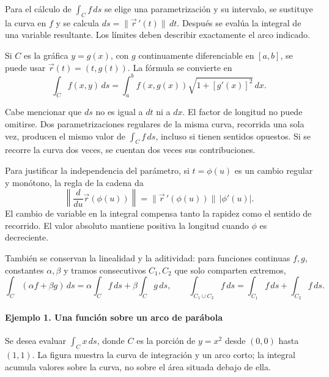 Para el cálculo de $\int_C f\,ds$ se elige una parametrización y su intervalo, se sustituye la curva en $f$ y se calcula $ds=\|\vec r\,'(t)\|\,dt$. Después se evalúa la integral de una variable resultante. Los límites deben describir exactamente el arco indicado.

Si $C$ es la gráfica $y=g(x)$, con $g$ continuamente diferenciable en $[a,b]$, se puede usar $\vec r(t)=(t,g(t))$. La fórmula se convierte en
\[
\int_C f(x,y)\,ds
=\int_a^b f(x,g(x))\sqrt{1+[g'(x)]^2}\,dx.
\]

Cabe mencionar que $ds$ no es igual a $dt$ ni a $dx$. El factor de longitud no puede omitirse. Dos parametrizaciones regulares de la misma curva, recorrida una sola vez, producen el mismo valor de $\int_C f\,ds$, incluso si tienen sentidos opuestos. Si se recorre la curva dos veces, se cuentan dos veces sus contribuciones.

Para justificar la independencia del parámetro, si $t=\phi(u)$ es un cambio regular y monótono, la regla de la cadena da
\[
\left\|\frac{d}{du}\vec r(\phi(u))\right\|
=\|\vec r\,'(\phi(u))\|\,|\phi'(u)|.
\]
El cambio de variable en la integral compensa tanto la rapidez como el sentido de recorrido. El valor absoluto mantiene positiva la longitud cuando $\phi$ es decreciente.

También se conservan la linealidad y la aditividad: para funciones continuas $f,g$, constantes $\alpha,\beta$ y tramos consecutivos $C_1,C_2$ que solo comparten extremos,
\[
\int_C(\alpha f+\beta g)\,ds
=\alpha\int_C f\,ds+\beta\int_C g\,ds,
\qquad
\int_{C_1\cup C_2}f\,ds=\int_{C_1}f\,ds+\int_{C_2}f\,ds.
\]

\paragraph{Ejemplo 1. Una función sobre un arco de parábola}

Se desea evaluar $\int_C x\,ds$, donde $C$ es la porción de $y=x^2$ desde $(0,0)$ hasta $(1,1)$. La figura muestra la curva de integración y un arco corto; la integral acumula valores sobre la curva, no sobre el área situada debajo de ella.

\begingroup
\shorthandoff{>}
\begin{center}
\end{center}
\endgroup

